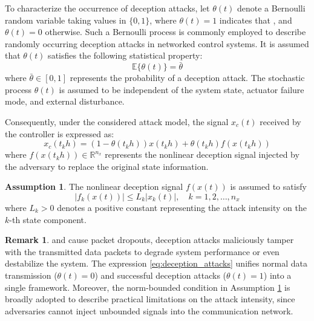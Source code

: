\documentclass[preprint,review,fleqn,sort&compress,3p]{elsarticle}
\theoremstyle{definition} %
\theoremstyle{definition}%
\newtheorem{rem}{Remark}[section]
\newtheorem{asptn}{Assumption}[section]
\newif\ifreviewmarkup
\DeclareRobustCommand{\revdel}[1]{\ifreviewmarkup{\color{revisionred}\hypersetup{linkcolor=revisionred,citecolor=revisionred}#1}\fi}
\DeclareRobustCommand{\revadd}[1]{{\ifreviewmarkup\color{revisiongreen}\hypersetup{linkcolor=revisiongreen,citecolor=revisiongreen}\fi#1}}
\begin{document}
\label{rev:M19}To characterize the occurrence of deception attacks, let $\theta(t)$ denote a Bernoulli random variable taking values in $\{0,1\}$, where $\theta(t)=1$ indicates that \revdel{the transmitted data is compromised by the attacker}, and $\theta(t) = 0$ otherwise. Such a Bernoulli process is commonly employed to describe randomly occurring deception attacks in networked control systems. It is assumed that $\theta(t)$ satisfies the following statistical property:
\begin{equation}
	\mathbb{E}\{\theta(t)\} = \bar{\theta} 
\end{equation}
where $\bar{\theta} \in [0,1]$ represents the probability of a deception attack.
The stochastic process $\theta(t)$ is assumed to be independent of the system state, actuator failure mode, and external disturbance.

Consequently, under the considered attack model, the signal $x_c(t)$ received by the controller is expressed as:
\begin{equation}\label{eq:deception_attacks}
	x_c(t_{k} h) = (1 - \theta(t_{k} h)) x(t_{k} h) + \theta(t_{k} h) f(x(t_{k} h))
\end{equation}
where $f(x(t_{k}h)) \in \mathbb{R}^{n_x}$ represents the nonlinear deception signal injected by the adversary to replace the original state information.

\begin{asptn} \label{assump:attack_bound}
The nonlinear deception signal $f(x(t))$ is assumed to satisfy
\begin{equation}
	|f_k(x(t))| \le L_k |x_k(t)|,\quad k = 1,2,\ldots,n_x
\end{equation}
where $L_k > 0$ denotes a positive constant representing the attack intensity on the $k$-th state component.
\end{asptn}
\begin{rem}
\label{rev:M20}	\revdel{Different from Denial-of-Service attacks that aim to block communication channels}
	and cause packet dropouts, deception attacks maliciously tamper with the transmitted data packets to
	degrade system performance or even destabilize the system. The expression \eqref{eq:deception_attacks} unifies normal data transmission ($\theta(t) = 0$) and successful deception attacks ($\theta(t) = 1$) into
	a single framework. Moreover, the norm-bounded condition in Assumption \ref{assump:attack_bound} is broadly adopted to
	describe practical limitations on the attack intensity, since adversaries cannot inject unbounded signals
	into the communication network.
\end{rem}
\end{document}
